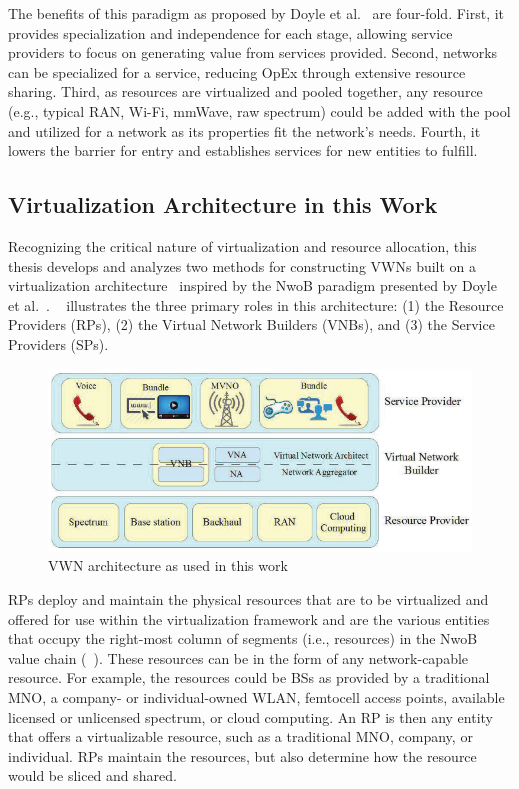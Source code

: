 \documentclass[12pt,dvipsnames]{report}
\begin{document}
The benefits of this paradigm as proposed by Doyle et al.~\cite{6737248} are four-fold.  First, it provides specialization and independence for each stage, allowing service providers to focus on generating value from services provided.  Second, networks can be specialized for a service, reducing OpEx through extensive resource sharing.  Third, as resources are virtualized and pooled together, any resource (e.g., typical RAN, Wi-Fi, mmWave, raw spectrum) could be added with the pool and utilized for a network as its properties fit the network's needs.  Fourth, it lowers the barrier for entry and establishes services for new entities to fulfill.

\subsection{Virtualization Architecture in this Work} \label{subsec:virtualization_architecture}

Recognizing the critical nature of virtualization and resource allocation, this thesis develops and analyzes two methods for constructing VWNs built on a virtualization architecture~\cite{MJ_CCNC_16, MJ_MECOMM_17} inspired by the NwoB paradigm presented by Doyle et al.~\cite{6737248}.  ~\cite{MJ_CCNC_16, MJ_MECOMM_17} illustrates the three primary roles in this architecture: (1) the Resource Providers (RPs), (2) the Virtual Network Builders (VNBs), and (3) the Service Providers (SPs).

\begin{figure}[ht]
	\centering
	\includegraphics[width=1\linewidth]{VWNArchitecture}
	\caption[VWN architecture as used in this work]{VWN architecture as used in this work~\cite{MJ_CCNC_16, MJ_MECOMM_17}}
	\label{fig:VWNArchitecture}
\end{figure}

RPs deploy and maintain the physical resources that are to be virtualized and offered for use within the virtualization framework and are the various entities that occupy the right-most column of segments (i.e., resources) in the NwoB value chain (~\cite{6737248}).  These resources can be in the form of any network-capable resource.  For example, the resources could be BSs as provided by a traditional MNO, a company- or individual-owned WLAN, femtocell access points, available licensed or unlicensed spectrum, or cloud computing.  An RP is then any entity that offers a virtualizable resource, such as a traditional MNO, company, or individual.  RPs maintain the resources, but also determine how the resource would be sliced and shared.
\end{document}
